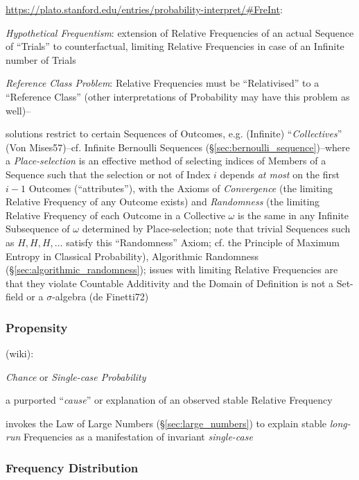 \url{https://plato.stanford.edu/entries/probability-interpret/#FreInt}:

\emph{Hypothetical Frequentism}: extension of Relative Frequencies of an actual
Sequence of ``Trials'' to counterfactual, limiting Relative Frequencies in case
of an Infinite number of Trials

\emph{Reference Class Problem}: Relative Frequencies must be ``Relativised'' to
a ``Reference Class'' (other interpretations of Probability may have this
problem as well)--

solutions restrict to certain Sequences of Outcomes, e.g. (Infinite)
``\emph{Collectives}'' (Von Mises57)--cf. Infinite Bernoulli Sequences
(\S\ref{sec:bernoulli_sequence})--where a \emph{Place-selection} is an effective
method of selecting indices of Members of a Sequence such that the selection or
not of Index $i$ depends \emph{at most} on the first $i-1$ Outcomes
(``attributes''), with the Axioms of \emph{Convergence} (the limiting Relative
Frequency of any Outcome exists) and \emph{Randomness} (the limiting Relative
Frequency of each Outcome in a Collective $\omega$ is the same in any Infinite
Subsequence of $\omega$ determined by Place-selection; note that trivial
Sequences such as $H,H,H,\ldots$ satisfy this ``Randomness'' Axiom; cf. the
Principle of Maximum Entropy in Classical Probability), Algorithmic Randomness
(\S\ref{sec:algorithmic_randomness});
issues with limiting Relative Frequencies are that they violate Countable
Additivity and the Domain of Definition is not a Set-field or a $\sigma$-algebra
(de Finetti72)



\subsubsection{Propensity}\label{sec:propensity}

(wiki):

\emph{Chance} or \emph{Single-case Probability}

a purported ``\emph{cause}'' or explanation of an observed stable Relative
Frequency

invokes the Law of Large Numbers (\S\ref{sec:large_numbers}) to explain stable
\emph{long-run} Frequencies as a manifestation of invariant \emph{single-case}



\subsubsection{Frequency Distribution}\label{sec:frequency_distribution}

